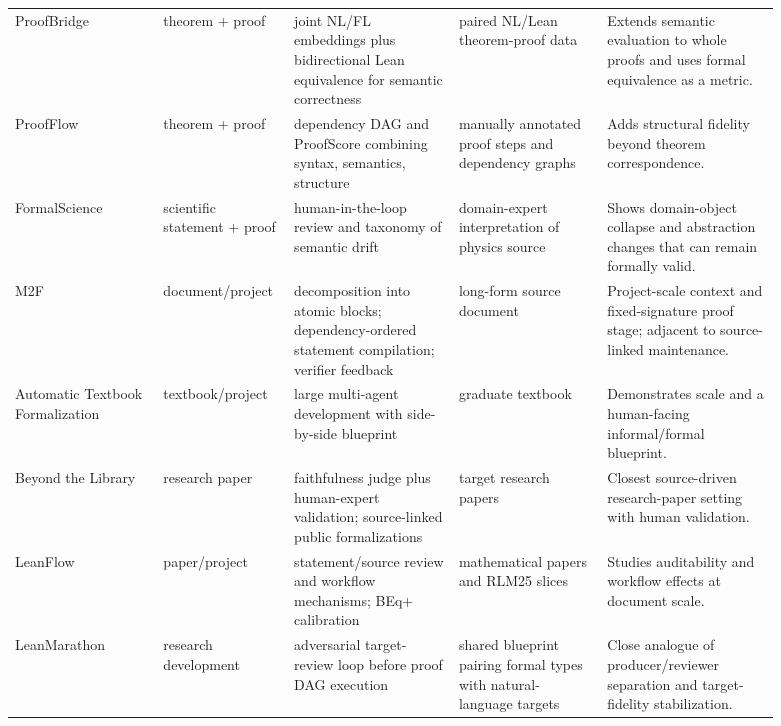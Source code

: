 \documentclass[11pt]{article}
\begin{document}
\begin{landscape}
\begin{longtable}{@{}p{0.18\linewidth}p{0.12\linewidth}p{0.20\linewidth}p{0.18\linewidth}p{0.21\linewidth}@{}}
ProofBridge \citep{jana2026proofbridge} & theorem + proof & joint NL/FL embeddings plus bidirectional Lean equivalence for semantic correctness & paired NL/Lean theorem-proof data & Extends semantic evaluation to whole proofs and uses formal equivalence as a metric. \\

ProofFlow \citep{cabral2026proofflow} & theorem + proof & dependency DAG and ProofScore combining syntax, semantics, structure & manually annotated proof steps and dependency graphs & Adds structural fidelity beyond theorem correspondence. \\

FormalScience \citep{meadows2026formalscience} & scientific statement + proof & human-in-the-loop review and taxonomy of semantic drift & domain-expert interpretation of physics source & Shows domain-object collapse and abstraction changes that can remain formally valid. \\

M2F \citep{wang2026m2f} & document/project & decomposition into atomic blocks; dependency-ordered statement compilation; verifier feedback & long-form source document & Project-scale context and fixed-signature proof stage; adjacent to source-linked maintenance. \\

Automatic Textbook Formalization \citep{gloeckle2026textbook} & textbook/project & large multi-agent development with side-by-side blueprint & graduate textbook & Demonstrates scale and a human-facing informal/formal blueprint. \\

Beyond the Library \citep{moakhar2026beyondlibrary} & research paper & faithfulness judge plus human-expert validation; source-linked public formalizations & target research papers & Closest source-driven research-paper setting with human validation. \\

LeanFlow \citep{milikic2026leanflow} & paper/project & statement/source review and workflow mechanisms; BEq+ calibration & mathematical papers and RLM25 slices & Studies auditability and workflow effects at document scale. \\

LeanMarathon \citep{zhang2026leanmarathon} & research development & adversarial target-review loop before proof DAG execution & shared blueprint pairing formal types with natural-language targets & Close analogue of producer/reviewer separation and target-fidelity stabilization. \\


\end{longtable}
\end{landscape}
\end{document}
